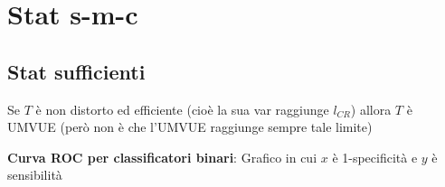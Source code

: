 

\section{Stat s-m-c}


\subsection{Stat sufficienti}

Se $T$ è non distorto ed efficiente (cioè la sua var raggiunge $l_{CR}$) allora $T$ è UMVUE (però non è che l'UMVUE raggiunge sempre tale limite)

\smallskip

\textbf{Curva ROC per classificatori binari}: Grafico in cui $x$ è 1-specificità e $y$ è sensibilità












